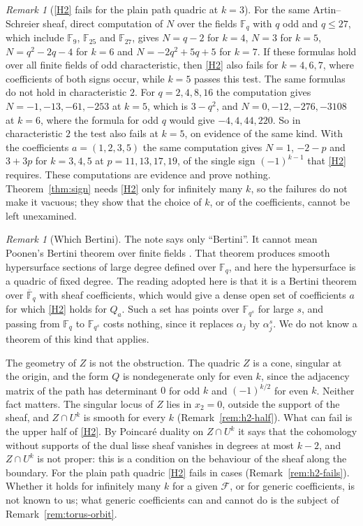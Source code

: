 \documentclass[11pt]{amsbook}
\theoremstyle{plain}
\theoremstyle{definition}
\theoremstyle{remark}
\newtheorem{remark}[theorem]{Remark}
\numberwithin{equation}{section}
\numberwithin{figure}{chapter}
\numberwithin{table}{chapter}
\newcommand{\F}{\mathbb{F}}
\newcommand{\Fb}{\overline{\F}_q}
\newcommand{\cF}{\mathcal{F}}
\begin{document}
\begin{remark}[\ref{H2} fails for the plain path quadric at $k=3$]
For the same Artin--Schreier sheaf, direct computation of $N$ over
the fields $\F_q$ with $q$ odd and $q\le27$, which include $\F_9$,
$\F_{25}$ and $\F_{27}$, gives $N=q-2$ for $k=4$,
$N=3$ for $k=5$, $N=q^2-2q-4$ for $k=6$ and $N=-2q^2+5q+5$ for
$k=7$. If these formulas hold over all finite fields of odd
characteristic, then
\ref{H2} also fails for $k=4,6,7$, where coefficients of both signs
occur, while $k=5$ passes this test. The same formulas do not hold
in characteristic $2$. For $q=2,4,8,16$ the computation gives
$N=-1,-13,-61,-253$ at $k=5$, which is $3-q^2$, and
$N=0,-12,-276,-3108$ at $k=6$, where the formula for odd $q$ would
give $-4,4,44,220$. So in characteristic $2$ the test also fails
at $k=5$, on evidence of the same kind. With the coefficients
$a=(1,2,3,5)$ the same computation gives $N=1$, $-2-p$ and $3+3p$
for $k=3,4,5$ at $p=11,13,17,19$, of the single sign $(-1)^{k-1}$
that \ref{H2} requires. These computations are evidence and prove
nothing. Theorem~\ref{thm:sign} needs \ref{H2} only for infinitely
many $k$, so the failures do not make it vacuous; they show that
the choice of $k$, or of the coefficients, cannot be left
unexamined.
\end{remark}

\begin{remark}[Which Bertini]\label{rem:bertini}
The note says only ``Bertini''. It cannot mean Poonen's Bertini
theorem over finite fields \cite{Poonen2004}. That theorem produces
smooth hypersurface sections of large degree defined over $\F_q$,
and here the hypersurface is a quadric of fixed degree. The reading
adopted here is that it is a Bertini theorem over $\Fb$ with sheaf
coefficients, which would give a dense open set of coefficients $a$
for which \ref{H2} holds for $Q_a$. Such a set has points over
$\F_{q^s}$ for large $s$, and passing from $\F_q$ to $\F_{q^s}$
costs nothing, since it replaces $\alpha_j$ by $\alpha_j^s$. We do
not know a theorem of this kind that applies.

The geometry of $Z$ is not the obstruction. The quadric $Z$ is a
cone, singular at the origin, and the form $Q$ is nondegenerate
only for even $k$, since the adjacency matrix of the path has
determinant $0$ for odd $k$ and $(-1)^{k/2}$ for even $k$. Neither
fact matters. The singular locus of $Z$ lies in
$x_2=0$, outside the support of the sheaf, and $Z\cap U^k$ is
smooth for every $k$ (Remark~\ref{rem:h2-half}). What can fail is
the upper half of \ref{H2}. By Poincar\'e duality on $Z\cap U^k$ it
says that the cohomology without supports of the dual lisse sheaf
vanishes in degrees at most $k-2$, and $Z\cap U^k$ is not proper:
this is a condition on the behaviour of the sheaf along the
boundary. For the plain path
quadric \ref{H2} fails in cases (Remark~\ref{rem:h2-fails}).
Whether it holds for infinitely many $k$ for a given $\cF$, or for
generic coefficients, is not known to us; what generic coefficients
can and cannot do is the subject of Remark~\ref{rem:torus-orbit}.
\end{remark}
\end{document}
